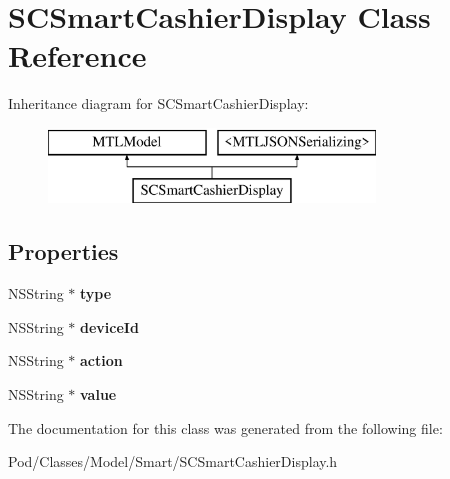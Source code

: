 \hypertarget{interface_s_c_smart_cashier_display}{}\section{S\+C\+Smart\+Cashier\+Display Class Reference}
\label{interface_s_c_smart_cashier_display}
Inheritance diagram for S\+C\+Smart\+Cashier\+Display\+:\begin{figure}[H]
\begin{center}
\leavevmode
\includegraphics[height=2.000000cm]{interface_s_c_smart_cashier_display}
\end{center}
\end{figure}
\subsection*{Properties}
\begin{DoxyCompactItemize}
\item 
N\+S\+String $\ast$ {\bfseries type}\hypertarget{interface_s_c_smart_cashier_display_acdb767f410f6fe80af390245fd9edf33}{}\label{interface_s_c_smart_cashier_display_acdb767f410f6fe80af390245fd9edf33}

\item 
N\+S\+String $\ast$ {\bfseries device\+Id}\hypertarget{interface_s_c_smart_cashier_display_a0df2ee3b338c9b3b3822e3a4b4a80a8a}{}\label{interface_s_c_smart_cashier_display_a0df2ee3b338c9b3b3822e3a4b4a80a8a}

\item 
N\+S\+String $\ast$ {\bfseries action}\hypertarget{interface_s_c_smart_cashier_display_a7af825d853b1c9c5308bfff872f2374a}{}\label{interface_s_c_smart_cashier_display_a7af825d853b1c9c5308bfff872f2374a}

\item 
N\+S\+String $\ast$ {\bfseries value}\hypertarget{interface_s_c_smart_cashier_display_a58b69395d4bed80f6652f001d8807060}{}\label{interface_s_c_smart_cashier_display_a58b69395d4bed80f6652f001d8807060}

\end{DoxyCompactItemize}


The documentation for this class was generated from the following file\+:\begin{DoxyCompactItemize}
\item 
Pod/\+Classes/\+Model/\+Smart/S\+C\+Smart\+Cashier\+Display.\+h\end{DoxyCompactItemize}
